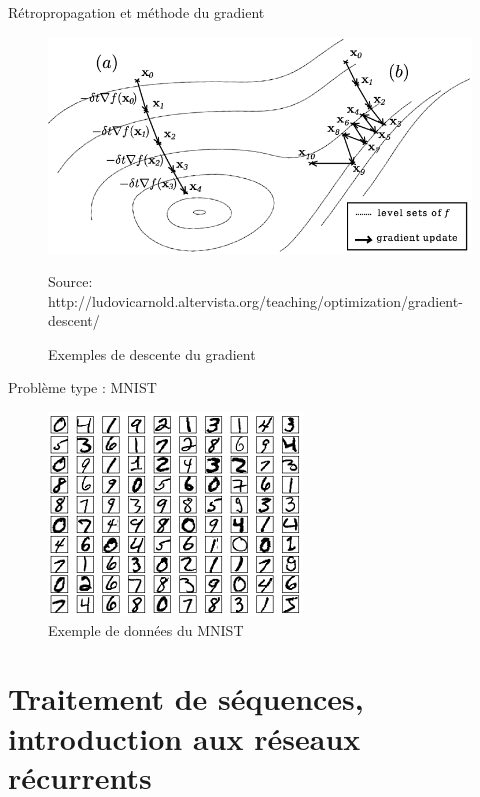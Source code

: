 \documentclass{beamer}
\begin{document}
\begin{frame}{Rétropropagation et méthode du gradient}
  \begin{figure}
  \begin{center}
  \includegraphics[scale=0.37]{images/descente_gradient.png}
  \caption{Exemples de descente du gradient}
  {\tiny Source: http://ludovicarnold.altervista.org/teaching/optimization/gradient-descent/}
  \end{center}
  \end{figure}
\end{frame}

\begin{frame}{Problème type : MNIST}
  \begin{figure}
  \begin{center}
  \includegraphics[scale=1.1]{images/mnist_data.png}
  \caption{Exemple de données du MNIST}
  \end{center}
  \end{figure}
\end{frame}

\section{Traitement de séquences, introduction aux réseaux récurrents}
\end{document}
